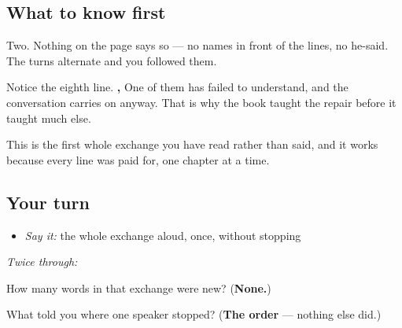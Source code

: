 \subsection*{What to know first}
Two. Nothing on the page says so — no names in front of the lines, no he-said. The turns alternate and you followed them.

Notice the eighth line. \textbf{ ,   } One of them has failed to understand, and the conversation carries on anyway. That is why the book taught the repair before it taught much else.

This is the first whole exchange you have read rather than said, and it works because every line was paid for, one chapter at a time.

\subsection*{Your turn}
\begin{itemize}
\raggedright
  \item \emph{Say it:} the whole exchange aloud, once, without stopping
\end{itemize}

\emph{Twice through:}

\begin{tcolorbox}[breakable,colback=teal!4,colframe=teal!35!black,title={Before you move on}]
How many words in that exchange were new? (\textbf{None.})

What told you where one speaker stopped? (\textbf{The order} — nothing else did.)
\end{tcolorbox}
